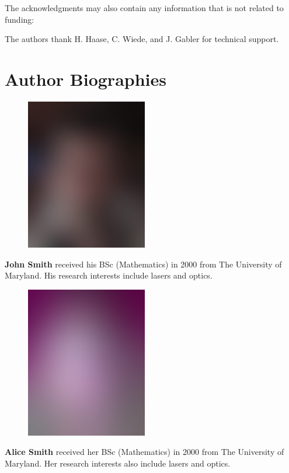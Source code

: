 \documentclass[9pt,twocolumn,twoside]{styles/osajnl}
\begin{document}
The acknowledgments may also contain any information that is not
related to funding:

The authors thank H. Haase, C. Wiede, and J. Gabler for technical
support.




 
\section*{Author Biographies}
\begingroup
\setlength\intextsep{0pt}
\begin{minipage}[t][3.2cm][t]{1.0\columnwidth} %
  \begin{figure}
    \includegraphics[width=0.25\columnwidth]{images/john_smith.eps}
  \end{figure}
  \noindent
  {\bfseries John Smith} received his BSc (Mathematics) in 2000 from
  The University of Maryland. His research interests include lasers
  and optics. 
\end{minipage}
\begin{minipage}[t][3.2cm][t]{1.0\columnwidth} %
  \begin{figure}
    \includegraphics[width=0.25\columnwidth]{images/alice_smith.eps}
  \end{figure}
  \noindent
  {\bfseries Alice Smith} received her BSc (Mathematics) in 2000 from
  The University of Maryland. Her research interests also include
  lasers and optics. 
\end{minipage}
\end{document}
